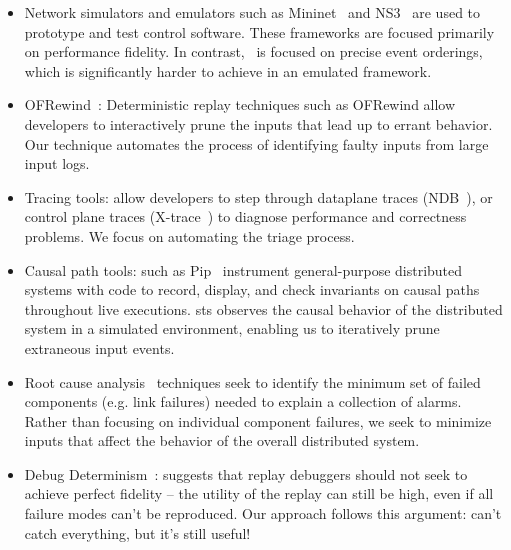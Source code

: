 \begin{itemize}
\item Network simulators and emulators such as
Mininet~\cite{Lantz:2010:NLR:1868447.1868466} and NS3~\cite{ns3}
are used to prototype and test control software. These frameworks are focused
primarily on performance fidelity. In contrast, \projectname~is focused on
precise event orderings, which is significantly harder to achieve in an
emulated framework.
\item OFRewind~\cite{ofrewind}: Deterministic replay techniques such as OFRewind allow developers to interactively prune the inputs that lead up to errant behavior. Our technique automates the process of identifying faulty inputs from large input logs.
\item Tracing tools: allow developers to step through dataplane traces (NDB~\cite{handigol2012debugger}), or control plane traces (X-trace~\cite{fonseca2007x}) to diagnose performance and correctness problems. We focus on automating the triage process.
\item Causal path tools: such as Pip~\cite{pip} instrument general-purpose distributed systems
with code to record, display, and check invariants on causal paths throughout
live executions. sts observes the causal behavior of the
distributed system in a simulated environment, enabling us to iteratively prune extraneous input events.
\item Root cause analysis~\cite{577079} techniques seek to identify the minimum set of failed
components (e.g. link failures) needed to explain a collection of alarms. Rather than
focusing on individual component failures, we seek to minimize inputs that affect the behavior
of the overall distributed system.
\item Debug Determinism~\cite{zamfir2011debug}: suggests that replay debuggers should not seek to achieve perfect fidelity -- the utility of the replay can still be high, even if all failure modes can't be reproduced. Our approach follows this argument: can't catch everything, but it's still useful!
\end{itemize}


